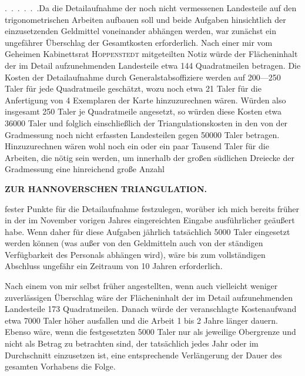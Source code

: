 \par\noindent\hspace*{\parindent}\mbox{.\ .\ .\ .\ .\ .}\quad Da die Detailaufnahme der noch nicht vermessenen Landesteile
auf den trigonometrischen Arbeiten aufbauen soll und beide Aufgaben
hinsichtlich der einzusetzenden Geldmittel voneinander abhängen werden,
war zunächst ein ungefährer Überschlag der Gesamtkosten erforderlich. Nach
einer mir vom Geheimen Kabinettsrat \textsc{Hoppenstedt} mitgeteilten Notiz
würde der Flächeninhalt der im Detail aufzunehmenden Landesteile etwa 144
Quadratmeilen betragen. Die Kosten der Detailaufnahme durch Generalstabsoffiziere
werden auf 200---250 Taler für jede Quadratmeile geschätzt, wozu noch etwa
21 Taler für die Anfertigung von 4 Exemplaren der Karte hinzuzurechnen wären.
Würden also insgesamt 250 Taler je Quadratmeile angesetzt, so würden diese
Kosten etwa 36000 Taler und folglich einschließlich der Triangulationskosten
in den von der Gradmessung noch nicht erfassten Landesteilen gegen 50000 Taler
betragen. Hinzuzurechnen wären wohl noch ein oder ein paar Tausend Taler für
die Arbeiten, die nötig sein werden, um innerhalb der großen südlichen
Dreiecke der Gradmessung eine hinreichend große Anzahl
\par
\clearpage
\noindent\null\hfill{\small\textbf{ZUR HANNOVERSCHEN TRIANGULATION.}}\hfill{}\par\medskip
\noindent fester Punkte für die Detailaufnahme festzulegen, worüber ich mich
bereits früher in der im November vorigen Jahres eingereichten Eingabe
ausführlicher geäußert habe. Wenn daher für diese Aufgaben jährlich
tatsächlich 5000 Taler eingesetzt werden können (was außer von den Geldmitteln
auch von der ständigen Verfügbarkeit des Personals abhängen wird), wäre bis
zum vollständigen Abschluss ungefähr ein Zeitraum von 10 Jahren erforderlich.

Nach einem von mir selbst früher angestellten, wenn auch vielleicht weniger
zuverlässigen Überschlag wäre der Flächeninhalt der im Detail aufzunehmenden
Landesteile 173 Quadratmeilen. Danach würde der veranschlagte Kostenaufwand
etwa 7000 Taler höher ausfallen und die Arbeit 1 bis 2 Jahre länger dauern.
Ebenso wäre, wenn die festgesetzten 5000 Taler nur als jeweilige Obergrenze
und nicht als Betrag zu betrachten sind, der tatsächlich jedes Jahr oder im
Durchschnitt einzusetzen ist, eine entsprechende Verlängerung der Dauer des
gesamten Vorhabens die Folge.

